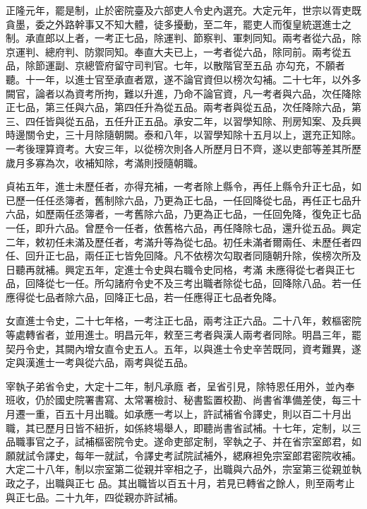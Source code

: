 \begin{pinyinscope}
 正隆元年，罷是制，止於密院臺及六部吏人令史內選充。大定元年，世宗以胥吏既貪墨，委之外路幹事又不知大體，徒多擾動，至二年，罷吏人而復皇統選進士之制。承直郎以上者，一考正七品，除運判、節察判、軍刺同知。兩考者從六品，除京運判、總府判、防禦同知。奉直大夫已上，一考者從六品，除同前。兩考從五品，除節運副、京總管府留守司判官。七年，以散階官至五品
 亦勾充，不願者聽。十一年，以進士官至承直者眾，遂不論官資但以榜次勾補。二十七年，以外多闕官，論者以為資考所拘，難以升進，乃命不論官資，凡一考者與六品，次任降除正七品，第三任與六品，第四任升為從五品。兩考者與從五品，次任降除六品，第三、四任皆與從五品，五任升正五品。承安二年，以習學知除、刑房知案、及兵興時邊關令史，三十月除隨朝闕。泰和八年，以習學知除十五月以上，選充正知除。一考後理算資考。大安三年，以從榜次則各人所歷月日不齊，遂以吏部等差其所歷歲月多寡為次，收補知除，考滿則授隨朝職。



 貞祐五年，進士未歷任者，亦得充補，一考者除上縣令，再任上縣令升正七品，如已歷一任任丞簿者，舊制除六品，乃更為正七品，一任回降從七品，再任正七品升六品，如歷兩任丞簿者，一考舊除六品，乃更為正七品，一任回免降，復免正七品一任，即升六品。曾歷令一任者，依舊格六品，再任降除七品，還升從五品。興定二年，敕初任未滿及歷任者，考滿升等為從七品。初任未滿者爾兩任、未歷任者四任、回升正七品，兩任正七皆免回降。凡不依榜次勾取者同隨朝升除，俟榜次所及日聽再就補。興定五年，定進士令史與右職令史同格，考滿
 未應得從七者與正七品，回降從七一任。所勾諸府令史不及三考出職者除從七品，回降除八品。若一任應得從七品者除六品，回降正七品，若一任應得正七品者免降。



 女直進士令史，二十七年格，一考注正七品，兩考注正六品。二十八年，敕樞密院等處轉省者，並用進士。明昌元年，敕至三考者與漢人兩考者同除。明昌三年，罷契丹令史，其闕內增女直令史五人。五年，以與進士令史辛苦既同，資考難異，遂定與漢進士一考與從六品，兩考與從五品。



 宰執子弟省令史，大定十二年，制凡承廕
 者，呈省引見，除特恩任用外，並內奉班收，仍於國史院署書寫、太常署檢討、秘書監置校勘、尚書省準備差使，每三十月遷一重，百五十月出職。如承應一考以上，許試補省令譯史，則以百二十月出職，其已歷月日皆不紐折，如係終場舉人，即聽尚書省試補。十七年，定制，以三品職事官之子，試補樞密院令史。遂命吏部定制，宰執之子、并在省宗室郎君，如願就試令譯史，每年一就試，令譯史考試院試補外，緦麻袒免宗室郎君密院收補。大定二十八年，制以宗室第二從親并宰相之子，出職與六品外，宗室第三從親並執政之子，出職與正七
 品。其出職皆以百五十月，若見已轉省之餘人，則至兩考止與正七品。二十九年，四從親亦許試補。



\end{pinyinscope}
